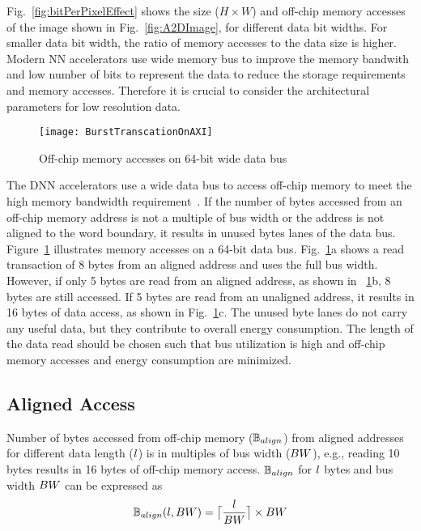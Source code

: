Fig.~\ref{fig:bitPerPixelEffect} shows the size ($H\times{W}$) and off-chip memory accesses of the image shown in  Fig.~\ref{fig:A2DImage}, for different data bit widths. For smaller data bit width, the ratio of memory accesses to the data size is higher. Modern NN accelerators use wide memory bus to improve the memory bandwith and low number of bits to represent the data to reduce the storage requirements and memory accesses. Therefore it is crucial to consider the architectural parameters for low resolution data.
\begin{figure}[!htb]
	\centering
	\captionsetup{font=sf}	
	\texttt{[image: BurstTranscationOnAXI]}
	\caption{Off-chip memory accesses on 64-bit wide data bus}
	\label{fig:AXI_AccesseOn64BitDataBus}
\end{figure}

The DNN accelerators use a wide data bus to access off-chip memory to meet the high memory bandwidth requirement~\cite{Chen2016EyerissAS,chen2014diannao}. If the number of bytes accessed from an off-chip memory address is not a multiple of bus width or the address is not aligned to the word boundary, it results in unused bytes lanes of the data bus. Figure~\ref{fig:AXI_AccesseOn64BitDataBus} illustrates memory accesses on a 64-bit data bus.  Fig.~\ref{fig:AXI_AccesseOn64BitDataBus}a shows a read transaction of 8 bytes from an aligned address and uses the full bus width. However, if only 5 bytes are read from an aligned address, as shown in \figurename~\ref{fig:AXI_AccesseOn64BitDataBus}b, 8 bytes are still accessed. If 5 bytes are read from an unaligned address, it results in 16 bytes of data access, as shown in Fig.~\ref{fig:AXI_AccesseOn64BitDataBus}c. The unused byte lanes do not carry any useful data, but they contribute to overall energy consumption. The length of the data read should be chosen such that bus utilization is high and off-chip memory accesses and energy consumption are minimized.

\subsection{Aligned Access}
Number of bytes accessed from off-chip memory ($\numBytesOffChip_{align}$) from aligned addresses for different data length ($\dataLength$) is in multiples of bus width ($\busWidth$), e.g., reading 10 bytes results in 16 bytes of off-chip memory access.  $\numBytesOffChip_{align}$ for $\dataLength$ bytes and bus width $\busWidth$ can be expressed as
\begin{align}\label{eq:alignedAccess}
	\begin{aligned}[b]
		\numBytesOffChip_{align}(\dataLength,\busWidth) = \ceil[\big]{\frac{\dataLength}{\busWidth}}\times {\busWidth}
	\end{aligned}
\end{align}
